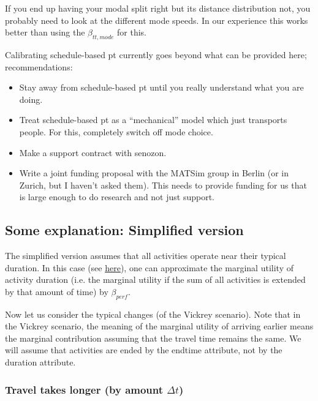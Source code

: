 If you end up having your modal split right but its distance distribution not, you probably need to look at the different mode speeds.  In our experience this works better than using the $\beta_{tt,mode}$ for this.

Calibrating schedule-based pt currently goes beyond what can be provided here; recommendations:
\begin{itemize}

\item Stay away from schedule-based pt until you really understand what you are doing.

\item Treat schedule-based pt as a ``mechanical'' model which just transports people.  For this, completely switch off mode choice.

\item Make a support contract with senozon.

\item Write a joint funding proposal with the MATSim group in Berlin (or in Zurich, but I haven't asked them).  This needs to provide funding for us that is large enough to do research and not just support.

\end{itemize}

\subsection{Some explanation: Simplified version}

The simplified version assumes that all activities operate near their typical duration. In this case (see \href{http://matsim.org/node/651}{here}),  one can approximate the marginal utility of activity duration (i.e. the  marginal utility if the sum of all activities is extended by that  amount of time) by $\beta_{perf}$.

Now let us consider the typical changes (of the Vickrey  scenario). Note that in the Vickrey scenario, the meaning of the  marginal utility of arriving earlier means the marginal contribution  assuming that the travel time remains the same. We will assume  that activities are ended by the endtime attribute, not by the duration  attribute.

\subsubsection{Travel takes longer (by amount $\Delta t$)}

